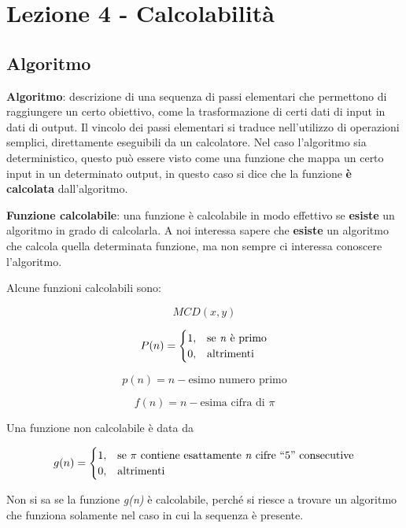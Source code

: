 \chapter{Lezione 4 - Calcolabilità}\label{lezione-4-computabilituxe0---calcolabilituxe0}

\section{Algoritmo}\label{algoritmo}

\textbf{Algoritmo}: descrizione di una sequenza di passi elementari che
permettono di raggiungere un certo obiettivo, come la trasformazione di
certi dati di input in dati di output. Il vincolo dei passi elementari
si traduce nell'utilizzo di operazioni semplici, direttamente eseguibili
da un calcolatore. Nel caso l'algoritmo sia deterministico, questo può
essere visto come una funzione che mappa un certo input in un
determinato output, in questo caso si dice che la funzione \textbf{è
calcolata} dall'algoritmo.

\textbf{Funzione calcolabile}: una funzione è calcolabile in modo
effettivo se \textbf{esiste} un algoritmo in grado di calcolarla. A noi
interessa sapere che \textbf{esiste} un algoritmo che calcola quella
determinata funzione, ma non sempre ci interessa conoscere l'algoritmo.

Alcune funzioni calcolabili sono:

$$ MCD(x,y) $$

$$
P(n) = \begin{cases}
1, &\text{se \textit{n} è primo} \\
0, &\text{altrimenti}
\end{cases}
$$

$$ p(n) = n-\text{esimo numero primo}$$

$$ f(n) = n-\text{esima cifra di }\pi$$

Una funzione non calcolabile è data da

$$
g(n) = \begin{cases}
1, &\text{se $\pi$ contiene esattamente \textit{n} cifre ``5'' consecutive} \\
0, &\text{altrimenti}
\end{cases}
$$

Non si sa se la funzione \emph{g(n)} è calcolabile, perché si riesce a
trovare un algoritmo che funziona solamente nel caso in cui la sequenza
è presente.

